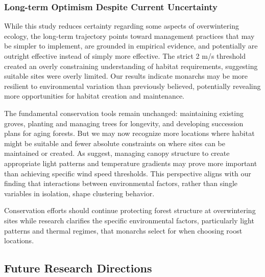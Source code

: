 \subsubsection{Long-term Optimism Despite Current Uncertainty}

While this study reduces certainty regarding some aspects of overwintering ecology, the long-term trajectory points toward management practices that may be simpler to implement, are grounded in empirical evidence, and potentially are outright effective instead of simply more effective. The strict 2 m/s threshold created an overly constraining understanding of habitat requirements, suggesting suitable sites were overly limited. Our results indicate monarchs may be more resilient to environmental variation than previously believed, potentially revealing more opportunities for habitat creation and maintenance.

The fundamental conservation tools remain unchanged: maintaining existing groves, planting and managing trees for longevity, and developing succession plans for aging forests. But we may now recognize more locations where habitat might be suitable and fewer absolute constraints on where sites can be maintained or created. As \textcite{sanieeHierarchyScaleInfluence2022} suggest, managing canopy structure to create appropriate light patterns and temperature gradients may prove more important than achieving specific wind speed thresholds. This perspective aligns with our finding that interactions between environmental factors, rather than single variables in isolation, shape clustering behavior.

Conservation efforts should continue protecting forest structure at overwintering sites while research clarifies the specific environmental factors, particularly light patterns and thermal regimes, that monarchs select for when choosing roost locations.

\subsection{Future Research Directions}

